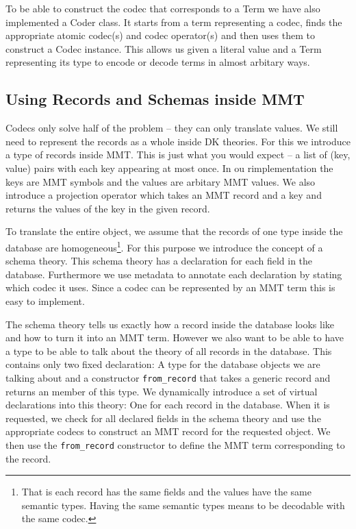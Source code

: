 \documentclass{deliverablereport}
\begin{document}
To be able to construct the codec that corresponds to a Term we have also implemented a Coder class. It starts from a term representing a codec, finds the appropriate atomic codec(s) and codec operator(s) and then uses them to construct a Codec instance. This allows us given a literal value  and a Term representing its type to encode or decode terms in almost arbitary ways.

\subsection{Using Records and Schemas inside MMT}

Codecs only solve half of the problem -- they can only translate values. We still need to represent the records as a whole inside DK theories. For this we introduce a type of records inside MMT. This is just what you would expect -- a list of (key, value) pairs with each key appearing at most once. In ou rimplementation the keys are MMT symbols and the values are arbitary MMT values. We also introduce a projection operator which takes an MMT record and a key and returns the values of the key in the given record.

To translate the entire object, we assume that the records of one type inside the database are homogeneous\footnote{That is each record has the same fields and the values have the same semantic types. Having the same semantic types means to be decodable with the same codec. }. For this purpose we introduce the concept of a schema theory. This schema theory has a declaration for each field in the database. Furthermore we use metadata to annotate each declaration by stating which codec it uses. Since a codec can be represented by an MMT term this is easy to implement.

The schema theory tells us exactly how a record inside the database looks like and how to turn it into an MMT term. However we also want to be able to have a type to be able to talk about the theory of all records in the database. This contains only two fixed declaration: A type for the database objects we are talking about and a constructor \texttt{from\_record} that takes a generic record and returns an member of this type. We dynamically introduce a set of virtual declarations into this theory: One for each record in the database. When it is requested, we check for all declared fields in the schema theory and use the appropriate codecs to construct an MMT record for the requested object. We then use the  \texttt{from\_record} constructor to define the MMT term corresponding to the record.
\end{document}
